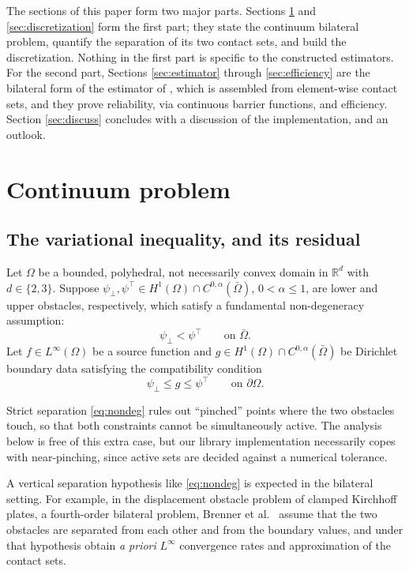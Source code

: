 \documentclass[12pt]{amsart}
\numberwithin{equation}{section}
\theoremstyle{plain}
\theoremstyle{definition}
\theoremstyle{remark}
\newcommand{\Om}{\Omega}
\newcommand{\dOm}{\partial\Omega}
\newcommand{\psilo}{\psi_\bot}
\newcommand{\psiup}{\psi^\top}
\begin{document}
The sections of this paper form two major parts.  Sections \ref{sec:setup} and \ref{sec:discretization} form the first part; they state the continuum bilateral problem, quantify the separation of its two contact sets, and build the discretization.  Nothing in the first part is specific to the constructed estimators.  For the second part, Sections \ref{sec:estimator} through \ref{sec:efficiency} are the bilateral form of the estimator of \cite{NSV03}, which is assembled from element-wise contact sets, and they prove reliability, via continuous barrier functions, and efficiency.  Section \ref{sec:discuss} concludes with a discussion of the implementation, and an outlook.


\section{Continuum problem} \label{sec:setup}

\subsection{The variational inequality, and its residual}  Let $\Om$ be a bounded, polyhedral, not necessarily convex domain in $\mathbb{R}^d$ with $d \in \{2,3\}$.  Suppose $\psilo, \psiup \in H^1(\Om) \cap C^{0,\alpha}(\bar\Om)$, $0 < \alpha \le 1$, are lower and upper obstacles, respectively, which satisfy a fundamental non-degeneracy assumption:
\begin{equation}
\label{eq:nondeg}
  \psilo < \psiup \qquad \text{on } \bar\Om.
\end{equation}
Let $f \in L^\infty(\Om)$ be a source function and $g \in H^1(\Om) \cap C^{0,\alpha}(\bar\Om)$ be Dirichlet boundary data satisfying the compatibility condition
\begin{equation}
\label{eq:compat}
  \psilo \le g \le \psiup \qquad \text{on } \dOm.
\end{equation}

Strict separation \eqref{eq:nondeg} rules out ``pinched'' points where the two obstacles touch, so that both constraints cannot be simultaneously active.  The analysis below is free of this extra case, but our library implementation necessarily copes with near-pinching, since active sets are decided against a numerical tolerance.

A vertical separation hypothesis like \eqref{eq:nondeg} is expected in the bilateral setting.  For example, in the displacement obstacle problem of clamped Kirchhoff plates, a fourth-order bilateral problem, Brenner et al.~\cite{Brenneretal2012} assume that the two obstacles are separated from each other and from the boundary values, and under that hypothesis obtain \emph{a priori} $L^\infty$ convergence rates and approximation of the contact sets.
\end{document}
